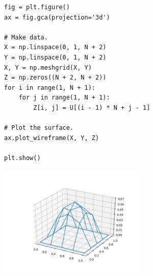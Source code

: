 \documentclass{beamer}
\begin{document}
\begin{frame}[fragile] 
\begin{lstlisting}
fig = plt.figure()
ax = fig.gca(projection='3d')

# Make data.
X = np.linspace(0, 1, N + 2)
Y = np.linspace(0, 1, N + 2)
X, Y = np.meshgrid(X, Y)
Z = np.zeros((N + 2, N + 2))
for i in range(1, N + 1):
    for j in range(1, N + 1):
        Z[i, j] = U[(i - 1) * N + j - 1]

# Plot the surface.
ax.plot_wireframe(X, Y, Z)

plt.show()
\end{lstlisting}

\end{frame}

\begin{frame}
 \begin{center}
\includegraphics[width=7cm]{surface.png}
\end{center}
\end{frame}
\end{document}
